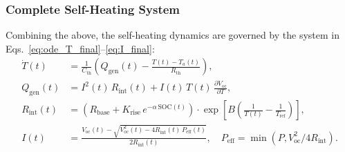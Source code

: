 \documentclass{mcmthesis}
\begin{document}
\subsubsection{Complete Self-Heating System}
Combining the above, the self-heating dynamics are governed by the system in Eqs.~\eqref{eq:ode_T_final}--\eqref{eq:I_final}:
\begin{align}
\dot{T}(t) &= \frac{1}{C_{\mathrm{th}}}\left(Q_{\mathrm{gen}}(t)-\frac{T(t)-T_a(t)}{R_{\mathrm{th}}}\right), \label{eq:ode_T_final}\\[6pt]
Q_{\mathrm{gen}}(t) &= I^2(t)\,R_{\mathrm{int}}(t) + I(t)\,T(t)\,\frac{\partial V_{\mathrm{oc}}}{\partial T}, \label{eq:Qgen_final}\\[6pt]
R_{\mathrm{int}}(t) &= \left( R_{\mathrm{base}} + K_{\mathrm{rise}}\,e^{-\alpha \,\mathrm{SOC}(t)} \right) \cdot \exp\left[ B \left( \frac{1}{T(t)} - \frac{1}{T_{\mathrm{ref}}} \right) \right], \label{eq:R_T_final}\\[6pt]
I(t) &= \frac{V_{\mathrm{oc}}(t)-\sqrt{V_{\mathrm{oc}}^2(t)-4R_{\mathrm{int}}(t)\,P_{\mathrm{eff}}(t)}}{2R_{\mathrm{int}}(t)}, \quad P_{\mathrm{eff}} = \min(P, V_{\mathrm{oc}}^2/4R_{\mathrm{int}}). \label{eq:I_final}
\end{align}
\end{document}
